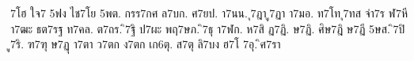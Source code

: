 {7โฮ
ใจ7
5ฟง
ไช7โย
5พต.
กรร7กศ
ล7บก.
ศ7ยป.
า7นน.
ุ7ฎา
ู7ฏา
า7มอ.
ท7โท
ุ7ทส
จ่า7ร
ฬ7หี
า7ฒะ
ธต7รฐ
ท7คล.
ต7ถร.
ิ7ฐิ
ป7ผะ
พฤ7ษภ.
ิ7ธุ
า7ฬก.
ห7สิ
ฏ7ฏิ.
ษ7ฏิ.
ศิษ7ฎิ
ษ7ฏี
5ษส.
ิ7ปิ
ู7ริ.
ฑ7ฑุ
ษ7ฏุ
า7ตา
ว7ตก
ง7ตก
เก6ตุ.
ส7ตุ
ลิ7บง
ฮ7โ
7อุ.
ิศ7รา
}
